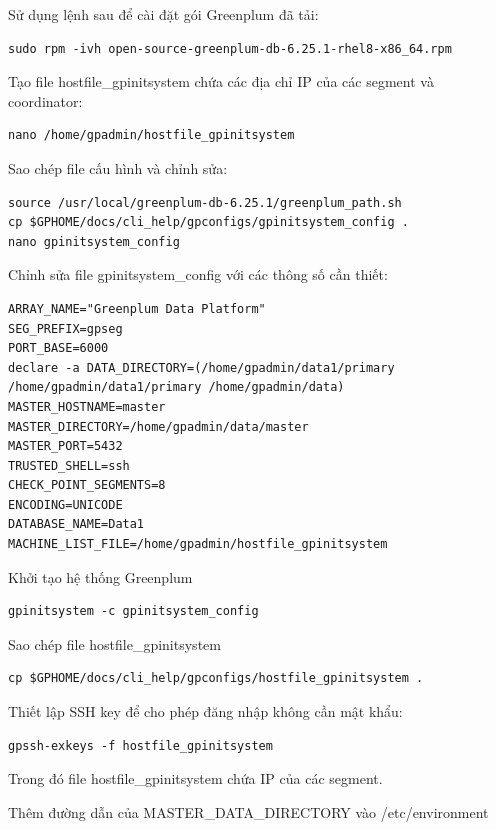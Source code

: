 \documentclass[14pt]{article}
\begin{document}
Sử dụng lệnh sau để cài đặt gói Greenplum đã tải:

\begin{verbatim}
sudo rpm -ivh open-source-greenplum-db-6.25.1-rhel8-x86_64.rpm
\end{verbatim}

Tạo file hostfile\_gpinitsystem chứa các địa chỉ IP của các segment và coordinator:

\begin{verbatim}
nano /home/gpadmin/hostfile_gpinitsystem
\end{verbatim}

Sao chép file cấu hình và chỉnh sửa:

\begin{verbatim}
source /usr/local/greenplum-db-6.25.1/greenplum_path.sh
cp $GPHOME/docs/cli_help/gpconfigs/gpinitsystem_config .
nano gpinitsystem_config
\end{verbatim}

Chỉnh sửa file gpinitsystem\_config với các thông số cần thiết:

\begin{verbatim}
ARRAY_NAME="Greenplum Data Platform"
SEG_PREFIX=gpseg
PORT_BASE=6000
declare -a DATA_DIRECTORY=(/home/gpadmin/data1/primary /home/gpadmin/data1/primary /home/gpadmin/data)
MASTER_HOSTNAME=master
MASTER_DIRECTORY=/home/gpadmin/data/master
MASTER_PORT=5432
TRUSTED_SHELL=ssh
CHECK_POINT_SEGMENTS=8
ENCODING=UNICODE
DATABASE_NAME=Data1
MACHINE_LIST_FILE=/home/gpadmin/hostfile_gpinitsystem
\end{verbatim}

Khởi tạo hệ thống Greenplum

\begin{verbatim}
gpinitsystem -c gpinitsystem_config
\end{verbatim}

Sao chép file hostfile\_gpinitsystem

\begin{verbatim}
cp $GPHOME/docs/cli_help/gpconfigs/hostfile_gpinitsystem .
\end{verbatim}

Thiết lập SSH key để cho phép đăng nhập không cần mật khẩu:

\begin{verbatim}
gpssh-exkeys -f hostfile_gpinitsystem
\end{verbatim}

Trong đó file hostfile\_gpinitsystem chứa IP của các segment.

Thêm đường dẫn của MASTER\_DATA\_DIRECTORY vào /etc/environment
\end{document}
